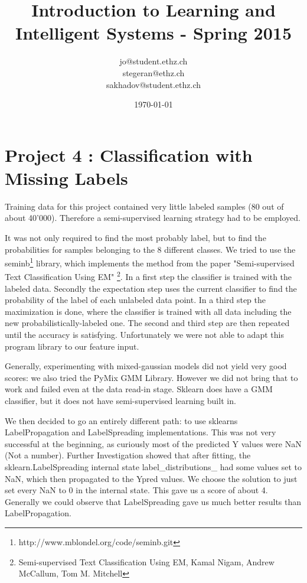 \documentclass[a4paper, 11pt]{article}
\title{Introduction to Learning and Intelligent Systems - Spring 2015}
\author{jo@student.ethz.ch\\ stegeran@ethz.ch\\sakhadov@student.ethz.ch}
\date{\today}
\begin{document}
\maketitle

\section*{Project 4 : Classification with Missing Labels}

Training data for this project contained very little labeled samples (80 out of about 40'000). Therefore a semi-supervised learning strategy had to be employed.

It was not only required to find the most probably label, but to find the probabilities for samples belonging to the 8 different classes. We tried to use the seminb\footnote{http://www.mblondel.org/code/seminb.git} library, which implements the method from the paper "Semi-supervised Text Classification Using EM" \footnote{Semi-supervised Text Classification Using EM, Kamal Nigam, Andrew McCallum, Tom M. Mitchell }. In a first step the classifier is trained with the labeled data. Secondly the expectation step uses the current classifier to find the probability of the label of each unlabeled data point. In a third step the maximization is done, where the classifier is trained with all data including the new probabilistically-labeled one. The second and third step are then repeated until the accuracy is satisfying.
Unfortunately we were not able to adapt this program library to our feature input.

Generally, experimenting with mixed-gaussian models did not yield very good scores: we also tried the PyMix GMM Library. However we did not bring that to work and failed even at the data read-in stage. Sklearn does have a GMM classifier, but it does not have semi-supervised learning built in.

We then decided to go an entirely different path: to use sklearns LabelPropagation and LabelSpreading implementations. This was not very successful at the beginning, as curiously most of the predicted Y values were NaN (Not a number). Further Investigation showed that after fitting, the sklearn.LabelSpreading internal state label\_distributions\_ had some values set to NaN, which then propagated to the Ypred values. We choose the solution to just set every NaN to 0 in the internal state. This gave us a score of about 4. Generally we could observe that LabelSpreading gave us much better results than LabelPropagation.
\end{document}
